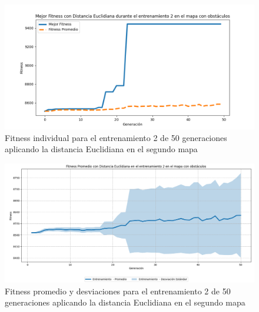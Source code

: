 \documentclass[conference]{IEEEtran}
\begin{document}
\begin{figure}[H]
    \centering
    \includegraphics[width=0.9 \linewidth]{Euclidiana/Mapa2/Fitness_2_Map2_Eucli_50Gen.png}
    \caption{Fitness individual para el entrenamiento 2 de 50 generaciones aplicando la distancia Euclidiana en el segundo mapa}
    \label{fig:eucli_2_50_m2}
\end{figure}
\begin{figure}[H]
    \centering
    \includegraphics[width=0.9 \linewidth]{Euclidiana/Mapa2/Fitness_2_Map2_Eucli_50Gen_Sombra.png}
    \caption{Fitness promedio y desviaciones para el entrenamiento 2 de 50 generaciones aplicando la distancia Euclidiana en el segundo mapa}
    \label{fig:eucli_2_50_sombra_m2}
\end{figure}
\end{document}
